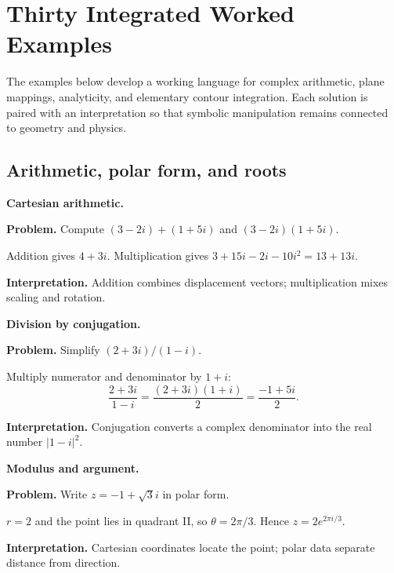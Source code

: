 \section{Thirty Integrated Worked Examples}
\label{sec:ch5-worked-examples}

The examples below develop a working language for complex arithmetic, plane mappings, analyticity, and elementary contour integration. Each solution is paired with an interpretation so that symbolic manipulation remains connected to geometry and physics.

\subsection{Arithmetic, polar form, and roots}

\begin{workedexample}
\textbf{Cartesian arithmetic.}\par
\textbf{Problem.} Compute $(3-2i)+(1+5i)$ and $(3-2i)(1+5i)$.
\begin{solution}
Addition gives $4+3i$. Multiplication gives $3+15i-2i-10i^2=13+13i$.

\textbf{Interpretation.} Addition combines displacement vectors; multiplication mixes scaling and rotation.
\end{solution}
\end{workedexample}

\begin{workedexample}
\textbf{Division by conjugation.}\par
\textbf{Problem.} Simplify $(2+3i)/(1-i)$.
\begin{solution}
Multiply numerator and denominator by $1+i$:
\[
\frac{2+3i}{1-i}=\frac{(2+3i)(1+i)}{2}=\frac{-1+5i}{2}.
\]

\textbf{Interpretation.} Conjugation converts a complex denominator into the real number $|1-i|^2$.
\end{solution}
\end{workedexample}

\begin{workedexample}
\textbf{Modulus and argument.}\par
\textbf{Problem.} Write $z=-1+\sqrt3 i$ in polar form.
\begin{solution}
$r=2$ and the point lies in quadrant II, so $\theta=2\pi/3$. Hence $z=2e^{2\pi i/3}$.

\textbf{Interpretation.} Cartesian coordinates locate the point; polar data separate distance from direction.
\end{solution}
\end{workedexample}

